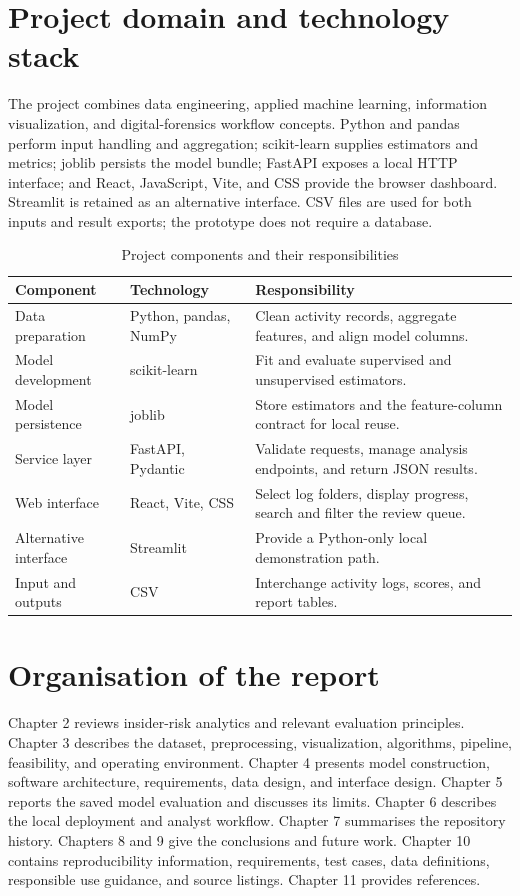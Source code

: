 \documentclass[12pt,a4paper,oneside]{report}
\newcommand{\tablefont}{\small}
\begin{document}
\section{Project domain and technology stack}
The project combines data engineering, applied machine learning,
information visualization, and digital-forensics workflow concepts.
Python and pandas perform input handling and aggregation;
scikit-learn supplies estimators and metrics; joblib persists the
model bundle; FastAPI exposes a local HTTP interface; and React,
JavaScript, Vite, and CSS provide the browser dashboard. Streamlit is
retained as an alternative interface. CSV files are used for both
inputs and result exports; the prototype does not require a database.

\begin{table}[H]
\centering
\tablefont
\caption{Project components and their responsibilities}
\label{tab:technology-stack}
\begin{tabularx}{\textwidth}{|p{}|p{}|Y|}
\hline
\textbf{Component} & \textbf{Technology} & \textbf{Responsibility}\\\hline
Data preparation & Python, pandas, NumPy & Clean activity records, aggregate features, and align model columns.\\\hline
Model development & scikit-learn & Fit and evaluate supervised and unsupervised estimators.\\\hline
Model persistence & joblib & Store estimators and the feature-column contract for local reuse.\\\hline
Service layer & FastAPI, Pydantic & Validate requests, manage analysis endpoints, and return JSON results.\\\hline
Web interface & React, Vite, CSS & Select log folders, display progress, search and filter the review queue.\\\hline
Alternative interface & Streamlit & Provide a Python-only local demonstration path.\\\hline
Input and outputs & CSV & Interchange activity logs, scores, and report tables.\\\hline
\end{tabularx}
\end{table}

\section{Organisation of the report}
Chapter 2 reviews insider-risk analytics and relevant evaluation
principles. Chapter 3 describes the dataset, preprocessing,
visualization, algorithms, pipeline, feasibility, and operating
environment. Chapter 4 presents model construction, software
architecture, requirements, data design, and interface design.
Chapter 5 reports the saved model evaluation and discusses its limits.
Chapter 6 describes the local deployment and analyst workflow.
Chapter 7 summarises the repository history. Chapters 8 and 9 give the
conclusions and future work. Chapter 10 contains reproducibility
information, requirements, test cases, data definitions, responsible
use guidance, and source listings. Chapter 11 provides references.
\end{document}
